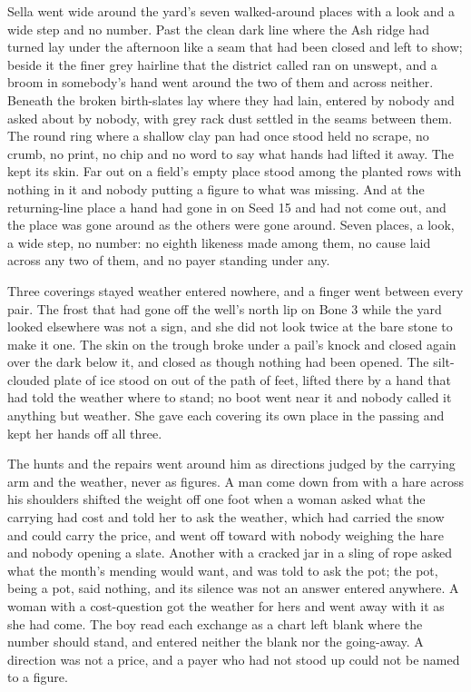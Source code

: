 Sella went wide around the yard's seven walked-around places with a look and a wide step and no number. Past  the clean dark line where the Ash ridge had turned lay under the afternoon like a seam that had been closed and left to show; beside it the finer grey hairline that the district called  ran on unswept, and a broom in somebody's hand went around the two of them and across neither. Beneath  the broken birth-slates lay where they had lain, entered by nobody and asked about by nobody, with grey rack dust settled in the seams between them. The round ring where a shallow clay pan had once stood held no scrape, no crumb, no print, no chip and no word to say what hands had lifted it away. The  kept its skin. Far out on  a field's empty place stood among the planted rows with nothing in it and nobody putting a figure to what was missing. And at the returning-line place a hand had gone in on Seed 15 and had not come out, and the place was gone around as the others were gone around. Seven places, a look, a wide step, no number: no eighth likeness made among them, no cause laid across any two of them, and no payer standing under any.

Three coverings stayed weather entered nowhere, and a finger went between every pair. The frost that had gone off the well's north lip on Bone 3 while the yard looked elsewhere was not a sign, and she did not look twice at the bare stone to make it one. The skin on the trough broke under a pail's knock and closed again over the dark below it, and closed as though nothing had been opened. The silt-clouded plate of ice stood on  out of the path of feet, lifted there by a hand that had told the weather where to stand; no boot went near it and nobody called it anything but weather. She gave each covering its own place in the passing and kept her hands off all three.

The hunts and the repairs went around him as directions judged by the carrying arm and the weather, never as figures. A man come down from  with a hare across his shoulders shifted the weight off one foot when a woman asked what the carrying had cost and told her to ask the weather, which had carried the snow and could carry the price, and went off toward  with nobody weighing the hare and nobody opening a slate. Another with a cracked jar in a sling of rope asked what the month's mending would want, and was told to ask the pot; the pot, being a pot, said nothing, and its silence was not an answer entered anywhere. A woman with a cost-question got the weather for hers and went away with it as she had come. The boy read each exchange as a chart left blank where the number should stand, and entered neither the blank nor the going-away. A direction was not a price, and a payer who had not stood up could not be named to a figure.


